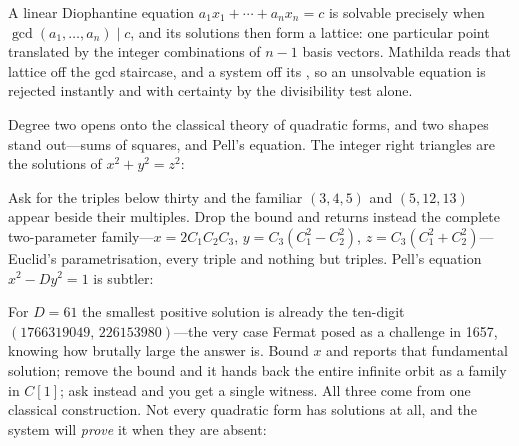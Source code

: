 A linear Diophantine equation $a_1x_1+\cdots+a_nx_n=c$ is solvable precisely when
$\gcd(a_1,\ldots,a_n)\mid c$, and its solutions then form a lattice: one particular point
translated by the integer combinations of $n-1$ basis vectors. Mathilda reads that lattice
off the gcd staircase, and a system off its , so an unsolvable
equation is rejected instantly and with certainty by the divisibility test alone.

Degree two opens onto the classical theory of quadratic forms, and two shapes stand
out---sums of squares, and Pell's equation. The integer right triangles are the solutions
of $x^2+y^2=z^2$:


Ask for the triples below thirty and the familiar $(3,4,5)$ and $(5,12,13)$ appear beside
their multiples. Drop the bound and  returns instead the complete two-parameter
family---$x=2C_1C_2C_3$, $y=C_3(C_1^2-C_2^2)$, $z=C_3(C_1^2+C_2^2)$---Euclid's
parametrisation, every triple and nothing but triples. Pell's equation $x^2-Dy^2=1$ is
subtler:


For $D=61$ the smallest positive solution is already the ten-digit
$(1766319049,\,226153980)$---the very case Fermat posed as a challenge in 1657, knowing
how brutally large the answer is. Bound $x$ and  reports that fundamental
solution; remove the bound and it hands back the entire infinite orbit as a
 family in $C[1]$; ask  instead and you get
a single witness. All three come from one classical construction. Not every
quadratic form has solutions at all, and the system will \emph{prove} it when they are
absent:

